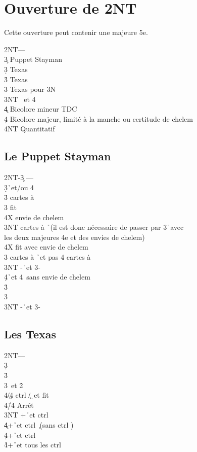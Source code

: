 \documentclass[a4paper]{article}
\begin{document}
\section{Ouverture de 2NT}

Cette ouverture peut contenir une majeure 5e.

\begin{bidtable}
2NT---\\
3\c \> Puppet Stayman\\
3\d \> Texas \h \\
3\h \> Texas \s \\
3\s \> Texas pour 3N\\
3NT \s\ et 4\h \\
4\c \> Bicolore mineur TDC\\
4\d \> Bicolore majeur, limité à la manche ou certitude de chelem\\
4NT \> Quantitatif
\end{bidtable}

\subsection{Le Puppet Stayman}

\begin{bidtable}
2NT-3\c \> ---\\
3\d {}\h\ et/ou 4\s \+\\
3\h {} cartes à \s \+\\
3\s \> fit \s \+\\
4X \> envie de chelem\-\\
3NT  cartes à \h\ (il est donc nécessaire de passer par 3\h\ avec\\
\>les deux majeures 4e et des envies de chelem)\\
\>4X fit avec envie de chelem\-\\
3\s {} cartes à \h\ et pas 4 cartes à \s \\
3NT -\h\ et 3-\s \\
4\d {}\h\ et 4\s\ sans envie de chelem\-\\
3\h {}\h \\
3\s {}\s \\
3NT -\h\ et 3-\s 
\end{bidtable}

\subsection{Les Texas}

\begin{bidtable}
2NT---\\
3\d\+\\
3\h {}\h \\
3\s {}\s\ et 2\h \+\\
4\c/4\d \> ctrl \c /\d\ et fit \s \\
4\h/4\s \> Arrêt\-\\
3NT +\h\ et ctrl \s \\
4\c {}+\h\ et ctrl \c\ (sans ctrl \s )\\
4\d {}+\h\ et ctrl \d \\
4\h {}+\h\ et tous les ctrl\-
\end{bidtable}
\end{document}
